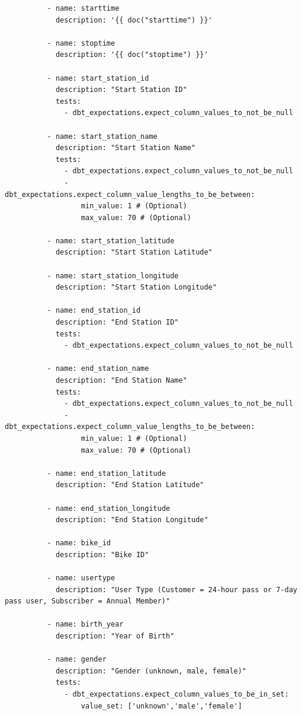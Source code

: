 \documentclass[
]{book}
\begin{document}
\begin{verbatim}
          - name: starttime
            description: '{{ doc("starttime") }}'
          
          - name: stoptime
            description: '{{ doc("stoptime") }}'

          - name: start_station_id
            description: "Start Station ID"
            tests:
              - dbt_expectations.expect_column_values_to_not_be_null
          
          - name: start_station_name
            description: "Start Station Name"
            tests:
              - dbt_expectations.expect_column_values_to_not_be_null
              - dbt_expectations.expect_column_value_lengths_to_be_between:
                  min_value: 1 # (Optional)
                  max_value: 70 # (Optional)

          - name: start_station_latitude
            description: "Start Station Latitude"
          
          - name: start_station_longitude
            description: "Start Station Longitude"

          - name: end_station_id
            description: "End Station ID"
            tests:
              - dbt_expectations.expect_column_values_to_not_be_null

          - name: end_station_name
            description: "End Station Name"
            tests:
              - dbt_expectations.expect_column_values_to_not_be_null
              - dbt_expectations.expect_column_value_lengths_to_be_between:
                  min_value: 1 # (Optional)
                  max_value: 70 # (Optional)

          - name: end_station_latitude
            description: "End Station Latitude"

          - name: end_station_longitude
            description: "End Station Longitude"
          
          - name: bike_id
            description: "Bike ID"
          
          - name: usertype
            description: "User Type (Customer = 24-hour pass or 7-day pass user, Subscriber = Annual Member)"

          - name: birth_year
            description: "Year of Birth"

          - name: gender
            description: "Gender (unknown, male, female)"
            tests:
              - dbt_expectations.expect_column_values_to_be_in_set:
                  value_set: ['unknown','male','female']


\end{verbatim}
\end{document}
